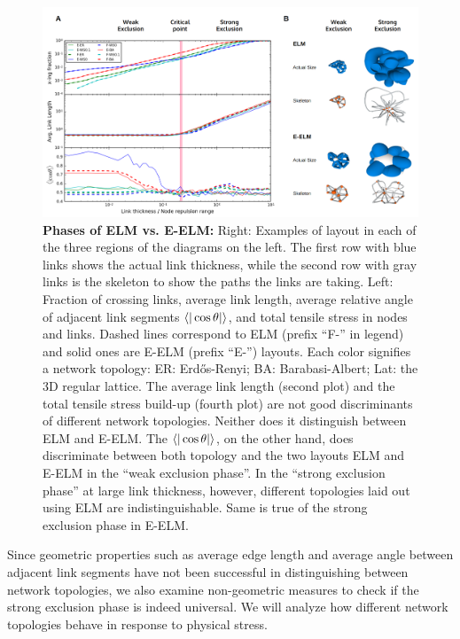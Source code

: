 \documentclass[nofootinbib,preprint,floatfix,endfloats]{revtex4} %
\begin{document}
\begin{figure}
    \centering
    \includegraphics[width=1\columnwidth]{fig-09-19/phase-compare-5.png}
    \caption{{\bf Phases of ELM vs. E-ELM:} Right: Examples of layout in each of the three regions of the diagrams on the left. 
    The first row with blue links shows the actual link thickness, while the second row with gray links is the skeleton to show the paths the links are taking.
    Left: Fraction of crossing links, average link length, average relative angle of adjacent link segments $\be{|\cos\theta |}$, and total tensile stress in nodes and links. 
    Dashed lines correspond to ELM (prefix ``F-'' in legend) and solid ones are E-ELM (prefix ``E-'') layouts. 
    Each color signifies a network topology: ER: Erdős-Renyi; BA: Barabasi-Albert; Lat: the 3D regular lattice. %
    The average link length (second plot) and the total tensile stress build-up (fourth plot) are not good discriminants of different network topologies. 
    Neither does it distinguish between ELM and E-ELM. The $\be{|\cos\theta |}$, on the other hand, does discriminate between both topology and the two layouts ELM and E-ELM in the  ``weak exclusion phase''. In the ``strong exclusion phase'' at large link thickness, however, different topologies laid out using ELM are indistinguishable. Same is true of the strong exclusion phase in E-ELM. %
    }
    \label{fig:phase-compare}
\end{figure}

Since geometric properties such as average edge length and average angle between adjacent link segments have not been successful in distinguishing between network topologies, we also examine non-geometric measures to check if the strong exclusion phase is indeed universal. We will analyze how different network topologies behave in response to physical stress.
\end{document}
